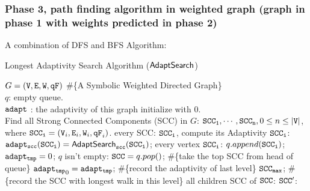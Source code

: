 \subsubsection{Phase 3, path finding algorithm in weighted graph (graph in phase 1 with weights predicted in phase 2) }
A combination of DFS and BFS Algorithm:
\begin{algorithm}
    \caption{
    {Longest Adaptivity Search Algorithm ($\mathsf{AdaptSearch}$)}
    \label{alg:adpt_alg}
    }
    \begin{algorithmic}[1]
    \REQUIRE $G = (\mathtt{V}, \mathtt{E}, \mathtt{W}, \mathtt{qF})$ \#\{A Symbolic Weighted Directed Graph\}
    \\
    $q$: empty queue.
    \\
    $\mathtt{adapt}$ : the adaptivity of this graph initialize with $0$.
    \\
    \STATE Find all Strong Connected Components (SCC) in $G$: $\mathtt{SCC_1}, \cdots, \mathtt{SCC_n}, 0 \leq n \leq |\mathtt{V}|$, where $\mathtt{SCC_i} = (\mathtt{V}_i, \mathtt{E}_i, \mathtt{W}_i, \mathtt{qF}_i)$.
     every SCC: $\mathtt{SCC_i}$, compute its Adaptivity $\mathtt{SCC_i}$:
    \STATE \quad $\mathtt{adapt_{scc}(SCC_i) = \mathsf{AdaptSearch}_{scc}(SCC_i)}$;
     every vertex $\mathtt{SCC_i}$:
    \STATE \qquad $q.append(\mathtt{SCC_i})$;
    \STATE \qquad $\mathtt{adapt_{tmp}} = 0$;
    \STATE {} $q$ isn't empty:
    \STATE \qquad \qquad $\mathtt{SCC}= q.pop()$;  \#\{take the top SCC from head of queue\}
    \STATE \qquad \qquad  $\mathtt{adapt_{tmp}}_0= \mathtt{adapt_{tmp}}$; \#\{record the adaptivity of last level\}
    \STATE \qquad \qquad  $\mathtt{SCC_{max}}$;  \#\{record the SCC with longest walk in this level\}
    \STATE \qquad {} all children SCC of $\mathtt{SCC}$: $\mathtt{SCC'}$:

\end{algorithmic}
\end{algorithm}
